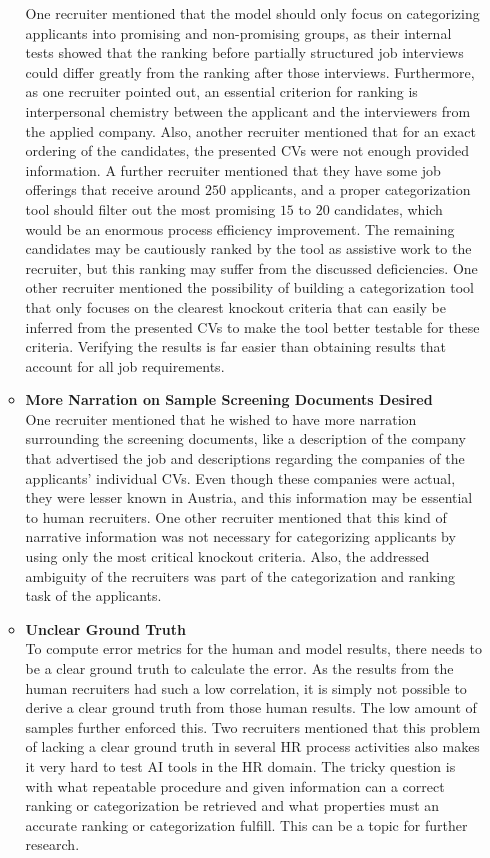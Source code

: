 \documentclass[draft,final]{thesisclass} %
\begin{document}
\begin{enumerate}
\begin{itemize}
        One recruiter mentioned that the model should only focus on categorizing applicants into promising and non-promising groups, as their internal tests showed that the ranking before partially structured job interviews could differ greatly from the ranking after those interviews. Furthermore, as one recruiter pointed out, an essential criterion for ranking is interpersonal chemistry between the applicant and the interviewers from the applied company. Also, another recruiter mentioned that for an exact ordering of the candidates, the presented \acs{CV}s were not enough provided information. A further recruiter mentioned that they have some job offerings that receive around $250$ applicants, and a proper categorization tool should filter out the most promising $15$ to $20$ candidates, which would be an enormous process efficiency improvement. The remaining candidates may be cautiously ranked by the tool as assistive work to the recruiter, but this ranking may suffer from the discussed deficiencies. One other recruiter mentioned the possibility of building a categorization tool that only focuses on the clearest knockout criteria that can easily be inferred from the presented \acs{CV}s to make the tool better testable for these criteria. Verifying the results is far easier than obtaining results that account for all job requirements.
        \item \textbf{More Narration on Sample Screening Documents Desired}\\
        One recruiter mentioned that he wished to have more narration surrounding the screening documents, like a description of the company that advertised the job and descriptions regarding the companies of the applicants' individual \acs{CV}s. Even though these companies were actual, they were lesser known in Austria, and this information may be essential to human recruiters. One other recruiter mentioned that this kind of narrative information was not necessary for categorizing applicants by using only the most critical knockout criteria. Also, the addressed ambiguity of the recruiters was part of the categorization and ranking task of the applicants.
        \item \textbf{Unclear Ground Truth}\\
        To compute error metrics for the human and model results, there needs to be a clear ground truth to calculate the error. As the results from the human recruiters had such a low correlation, it is simply not possible to derive a clear ground truth from those human results. The low amount of samples further enforced this. Two recruiters mentioned that this problem of lacking a clear ground truth in several \acs{HR} process activities also makes it very hard to test \acs{AI} tools in the \acs{HR} domain. The tricky question is with what repeatable procedure and given information can a correct ranking or categorization be retrieved and what properties must an accurate ranking or categorization fulfill. This can be a topic for further research.

\end{itemize}
\end{enumerate}
\end{document}
